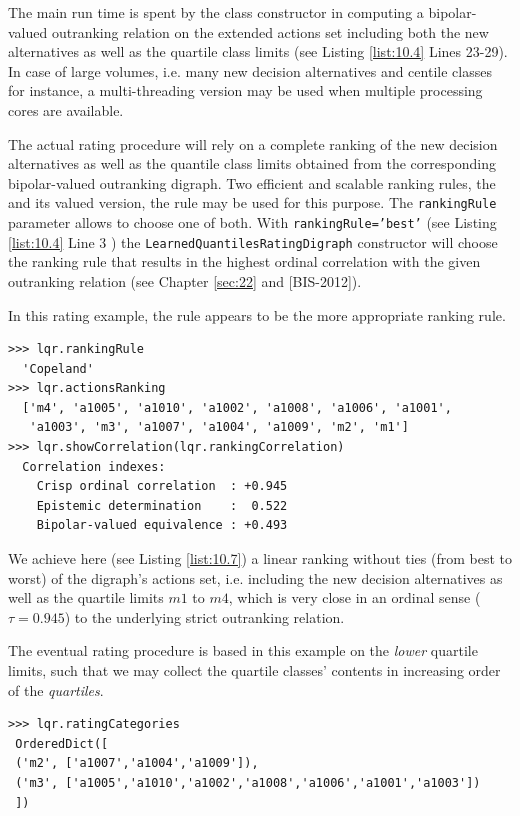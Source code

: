 The main run time is spent by the class constructor in computing a bipolar-valued outranking relation on the extended actions set including both the new alternatives as well as the quartile class limits (see Listing \ref{list:10.4} Lines 23-29). In case of large volumes, i.e. many new decision alternatives and centile classes for instance, a multi-threading version may be used when multiple processing cores are available.

The actual rating procedure will rely on a complete ranking of the new decision alternatives as well as the quantile class limits obtained from the corresponding bipolar-valued outranking digraph. Two efficient and scalable ranking rules, the \Copeland and its valued version, the \NetFlows rule may be used for this purpose. The \texttt{rankingRule} parameter allows to choose one of both. With \texttt{rankingRule='best'} (see Listing \ref{list:10.4} Line 3 ) the \texttt{LearnedQuantilesRatingDigraph} constructor will choose the ranking rule that results in the highest ordinal correlation with the given outranking relation (see Chapter \ref{sec:22} and [BIS-2012]).

In this rating example, the \Copeland rule appears to be the more appropriate ranking rule.

\begin{lstlisting}[caption={\Copeland ranking of new alternatives and historical quartile limits},label=list:10.7]
>>> lqr.rankingRule
  'Copeland'
>>> lqr.actionsRanking
  ['m4', 'a1005', 'a1010', 'a1002', 'a1008', 'a1006', 'a1001',
   'a1003', 'm3', 'a1007', 'a1004', 'a1009', 'm2', 'm1'] 
>>> lqr.showCorrelation(lqr.rankingCorrelation)
  Correlation indexes:
    Crisp ordinal correlation  : +0.945
    Epistemic determination    :  0.522
    Bipolar-valued equivalence : +0.493
\end{lstlisting}

We achieve here (see Listing \ref{list:10.7}) a linear ranking without ties (from best to worst) of the digraph's actions set, i.e. including the new decision alternatives as well as the quartile limits $m1$ to $m4$, which is very close in an ordinal sense ($\tau = 0.945$) to the underlying strict outranking relation.

The eventual rating procedure is based in this example on the \emph{lower} quartile limits, such that we may collect the quartile classes' contents in increasing order of the \emph{quartiles}.

\begin{lstlisting}
>>> lqr.ratingCategories
 OrderedDict([
 ('m2', ['a1007','a1004','a1009']),
 ('m3', ['a1005','a1010','a1002','a1008','a1006','a1001','a1003'])
 ])
\end{lstlisting}    

